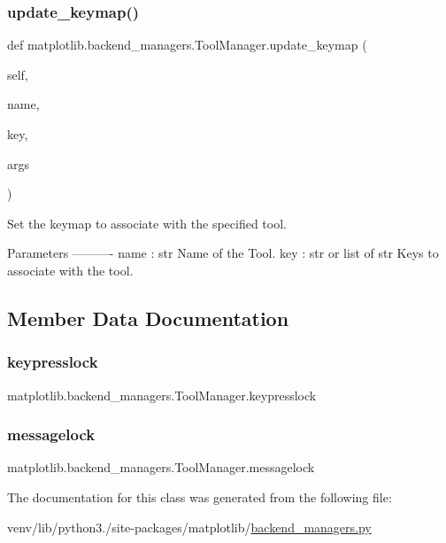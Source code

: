 \subsubsection{\texorpdfstring{update\+\_\+keymap()}{update\_keymap()}}
{\footnotesize\ttfamily def matplotlib.\+backend\+\_\+managers.\+Tool\+Manager.\+update\+\_\+keymap (\begin{DoxyParamCaption}\item[{}]{self,  }\item[{}]{name,  }\item[{}]{key,  }\item[{}]{args }\end{DoxyParamCaption})}

\begin{DoxyVerb}Set the keymap to associate with the specified tool.

Parameters
----------
name : str
    Name of the Tool.
key : str or list of str
    Keys to associate with the tool.
\end{DoxyVerb}
 

\subsection{Member Data Documentation}
\mbox{\label{classmatplotlib_1_1backend__managers_1_1ToolManager_a43e924a83290e3c015b1cfabe6f28acb}} 
\subsubsection{\texorpdfstring{keypresslock}{keypresslock}}
{\footnotesize\ttfamily matplotlib.\+backend\+\_\+managers.\+Tool\+Manager.\+keypresslock}

\mbox{\label{classmatplotlib_1_1backend__managers_1_1ToolManager_a43829822158e8ddbb92dc16f95a290e9}} 
\subsubsection{\texorpdfstring{messagelock}{messagelock}}
{\footnotesize\ttfamily matplotlib.\+backend\+\_\+managers.\+Tool\+Manager.\+messagelock}



The documentation for this class was generated from the following file\+:\begin{DoxyCompactItemize}
\item 
venv/lib/python3./site-\/packages/matplotlib/\hyperlink{backend__managers_8py}{backend\+\_\+managers.\+py}\end{DoxyCompactItemize}
